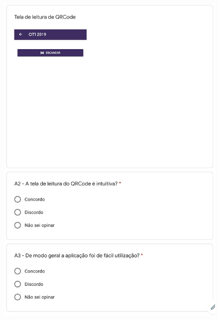 \begin{figure}[H]
    \centering
    \includegraphics[scale=0.35]{figuras/questionario2.jpg}
\end{figure}

